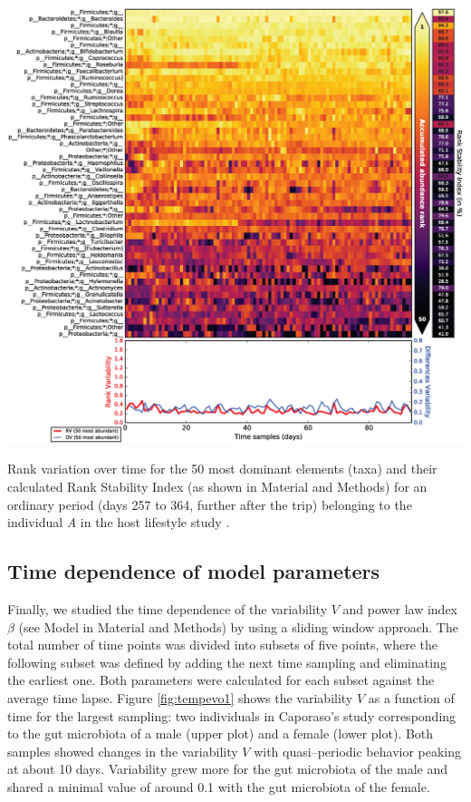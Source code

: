 \begin{supfig}
	\centering
	\includegraphics[width=1.0\textwidth]{figs/supfig_corrank_HLS_StoolA_after.eps}
	\caption{Rank variation over time for the 50 most dominant elements (taxa) and their calculated Rank Stability Index (as shown in Material and Methods) for an ordinary period (days 257 to 364, further after the trip) belonging to the individual \emph{A} in the host lifestyle study \cite{hostlife}.}
	\label{supfig:corrank_HLS_after}
\end{supfig}

\subsection*{Time dependence of model parameters}

Finally, we studied the time dependence of the variability $V$ and power law index $\beta$ (see Model in Material and Methods) by using a sliding window approach. The total number of time points was divided into subsets of five points, where the following subset was defined by adding the next time sampling and eliminating the earliest one. Both parameters were calculated for each subset against the average time lapse. Figure \ref{fig:tempevo1} shows the variability $V$ as a function of time for the largest sampling: two individuals in Caporaso's study\cite{moving} corresponding to the gut microbiota of a male (upper plot) and a female (lower plot). Both samples showed changes in the variability $V$ with quasi--periodic behavior peaking at about 10 days. Variability grew more for the gut microbiota of the male and shared a minimal value of around 0.1 with the gut microbiota of the female. 

